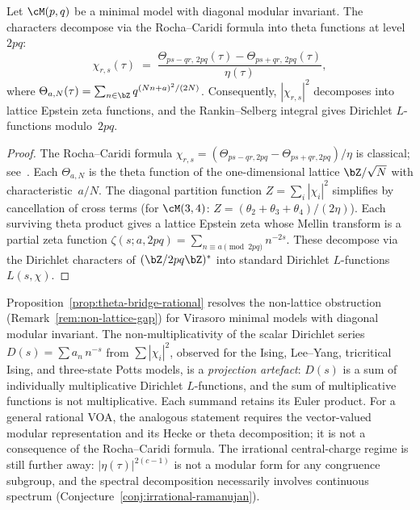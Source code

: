 \begin{proposition}%
\label{prop:theta-bridge-rational}%
\ClaimStatusProvedHere%
%
%
Let $\cM(p,q)$ be a minimal model with diagonal modular
invariant. The characters decompose via the Rocha--Caridi
formula into theta functions at level~$2pq$:
\begin{equation}\label{eq:theta-bridge}
 \chi_{r,s}(\tau)
 \;=\;
 \frac{\Theta_{ps-qr,\,2pq}(\tau)
 - \Theta_{ps+qr,\,2pq}(\tau)}{\eta(\tau)},
\end{equation}
where $\Theta_{a,N}(\tau) =
\sum_{n\in\bZ} q^{(Nn+a)^2/(2N)}$.
Consequently, $|\chi_{r,s}|^2$ decomposes into lattice
Epstein zeta functions, and the Rankin--Selberg integral gives
Dirichlet $L$-functions modulo~$2pq$.
\end{proposition}

\begin{proof}
The Rocha--Caridi formula
$\chi_{r,s} =
(\Theta_{ps-qr,2pq}-\Theta_{ps+qr,2pq})/\eta$
is classical; see~\cite{DiFrancesco1997}.
Each $\Theta_{a,N}$ is the theta function of the
one-dimensional lattice $\bZ/\sqrt{N}$ with
characteristic~$a/N$.
The diagonal partition function
$Z = \sum_{i}|\chi_i|^2$ simplifies by cancellation
of cross terms
(for $\cM(3,4)$: $Z = (\theta_2+\theta_3+\theta_4)/(2\eta)$).
Each surviving theta product gives a lattice Epstein zeta
whose Mellin transform is a partial zeta function
$\zeta(s;a,2pq) = \sum_{n\equiv a\pmod{2pq}} n^{-2s}$.
These decompose via the Dirichlet characters of
$(\bZ/2pq\bZ)^*$ into standard Dirichlet $L$-functions
$L(s,\chi)$.
\end{proof}

\begin{remark}%
\label{rem:theta-bridge-resolution}%
%
%
Proposition~\ref{prop:theta-bridge-rational} resolves the
non-lattice obstruction
(Remark~\ref{rem:non-lattice-gap}) for Virasoro minimal models with
diagonal modular invariant.
The non-multiplicativity of the scalar Dirichlet series
$D(s) = \sum a_n\,n^{-s}$ from $\sum|\chi_i|^2$, observed
for the Ising, Lee--Yang, tricritical Ising, and three-state
Potts models, is a \emph{projection artefact}: $D(s)$ is a
sum of individually multiplicative Dirichlet $L$-functions,
and the sum of multiplicative functions is not multiplicative.
Each summand retains its Euler product.
For a general rational VOA, the analogous statement requires the
vector-valued modular representation and its Hecke or theta
decomposition; it is not a consequence of the Rocha--Caridi formula.
The irrational central-charge regime is still further away:
$|\eta(\tau)|^{2(c-1)}$ is not a modular form for any congruence
subgroup, and the spectral decomposition necessarily involves
continuous spectrum (Conjecture~\ref{conj:irrational-ramanujan}).
\end{remark}

